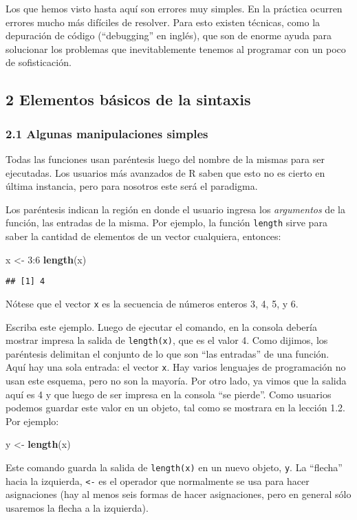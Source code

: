 \documentclass[]{article}
\newenvironment{Shaded}{}{}
\newcommand{\KeywordTok}[1]{\textcolor[rgb]{0.00,0.44,0.13}{\textbf{{#1}}}}
\newcommand{\DecValTok}[1]{\textcolor[rgb]{0.25,0.63,0.44}{{#1}}}
\newcommand{\NormalTok}[1]{{#1}}
\begin{document}
Los que hemos visto hasta aquí son errores muy simples. En la práctica
ocurren errores mucho más difíciles de resolver. Para esto existen
técnicas, como la depuración de código (``debugging'' en inglés), que
son de enorme ayuda para solucionar los problemas que inevitablemente
tenemos al programar con un poco de sofisticación.

\subsection{2 Elementos básicos de la sintaxis}

\subsubsection{2.1 Algunas manipulaciones simples}

Todas las funciones usan paréntesis luego del nombre de la mismas para
ser ejecutadas. Los usuarios más avanzados de R saben que esto no es
cierto en última instancia, pero para nosotros este será el paradigma.

Los paréntesis indican la región en donde el usuario ingresa los
\emph{argumentos} de la función, las entradas de la misma. Por ejemplo,
la función \texttt{length} sirve para saber la cantidad de elementos de
un vector cualquiera, entonces:

\begin{Shaded}
\begin{Highlighting}[]
\NormalTok{x <- }\DecValTok{3}\NormalTok{:}\DecValTok{6}
\KeywordTok{length}\NormalTok{(x)}
\end{Highlighting}
\end{Shaded}
\begin{verbatim}
## [1] 4
\end{verbatim}
Nótese que el vector \texttt{x} es la secuencia de números enteros 3, 4,
5, y 6.

Escriba este ejemplo. Luego de ejecutar el comando, en la consola
debería mostrar impresa la salida de \texttt{length(x)}, que es el valor
4. Como dijimos, los paréntesis delimitan el conjunto de lo que son
``las entradas'' de una función. Aquí hay una sola entrada: el vector
\texttt{x}. Hay varios lenguajes de programación no usan este esquema,
pero no son la mayoría. Por otro lado, ya vimos que la salida aquí es 4
y que luego de ser impresa en la consola ``se pierde''. Como usuarios
podemos guardar este valor en un objeto, tal como se mostrara en la
lección 1.2. Por ejemplo:

\begin{Shaded}
\begin{Highlighting}[]
\NormalTok{y <- }\KeywordTok{length}\NormalTok{(x)}
\end{Highlighting}
\end{Shaded}
Este comando guarda la salida de \texttt{length(x)} en un nuevo objeto,
\texttt{y}. La ``flecha'' hacia la izquierda, \texttt{\textless{}-} es
el operador que normalmente se usa para hacer asignaciones (hay al menos
seis formas de hacer asignaciones, pero en general sólo usaremos la
flecha a la izquierda).
\end{document}
